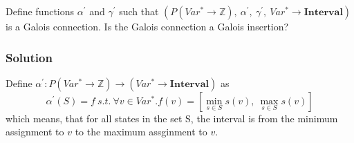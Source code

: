 Define functions $\alpha^{'}$ and $\gamma^{'}$ such that $(P(Var^*\rightarrow \mathbb{Z}),\ \alpha^{'},\ \gamma^{'},\ Var^*\rightarrow \mathbf{Interval})$ is a Galois connection. Is the Galois connection a Galois insertion?

\subsubsection*{Solution}
Define $\alpha^{'}:P(Var^*\rightarrow \mathbb{Z})\rightarrow (Var^*\rightarrow \mathbf{Interval})$ as
\begin{equation*}
\alpha^{'}(S)=f\ s.t.\ \forall v\in Var^*.f(v)=[\min\limits_{s\in S}s(v),\ \max\limits_{s\in S}s(v)]
\end{equation*}
which means, that for all states in the set S, the interval is from the minimum assignment to $v$ to the maximum assginment to $v$.\\

